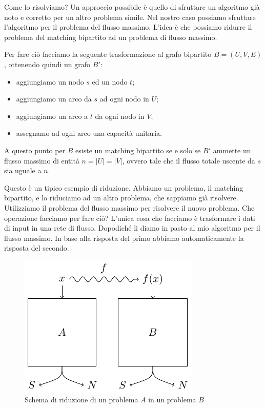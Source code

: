 Come lo risolviamo? Un approccio possibile è quello di sfruttare un algoritmo già noto e corretto
per un altro problema simile. Nel nostro caso possiamo sfruttare l'algoritmo per il problema del
flusso massimo. L'idea è che possiamo ridurre il problema del matching bipartito ad un problema di
flusso massimo.

Per fare ciò facciamo la seguente trasformazione al grafo bipartito $B = (U,V,E)$, ottenendo quindi un grafo
$B'$:
\begin{itemize}
    \item aggiungiamo un nodo $s$ ed un nodo $t$;
    \item aggiungiamo un arco da $s$ ad ogni nodo in $U$;
    \item aggiungiamo un arco a $t$ da ogni nodo in $V$;
    \item assegnamo ad ogni arco una capacità unitaria.
\end{itemize}

A questo punto per $B$ esiste un matching bipartito se e solo se $B'$ ammette un flusso massimo di
entità $n = |U| = |V|$, ovvero tale che il flusso totale uscente da $s$ sia uguale a $n$.

Questo è un tipico esempio di riduzione. Abbiamo un problema, il matching bipartito, e lo riduciamo
ad un altro problema, che sappiamo già risolvere. Utilizziamo il problema del flusso massimo per risolvere
il nuovo problema. Che operazione facciamo per fare ciò? L'unica cosa che facciamo è trasformare
i dati di input in una rete di flusso. Dopodiché li diamo in pasto al mio algoritmo per il flusso
massimo.  In base alla risposta del primo abbiamo automaticamente la risposta del secondo.

\begin{figure}[h]
    \begin{center}
        \includegraphics{./img/complexity_intro/Reducibility.pdf}
    \end{center}
    \caption{Schema di riduzione di un problema $A$ in un problema $B$}
\end{figure}

